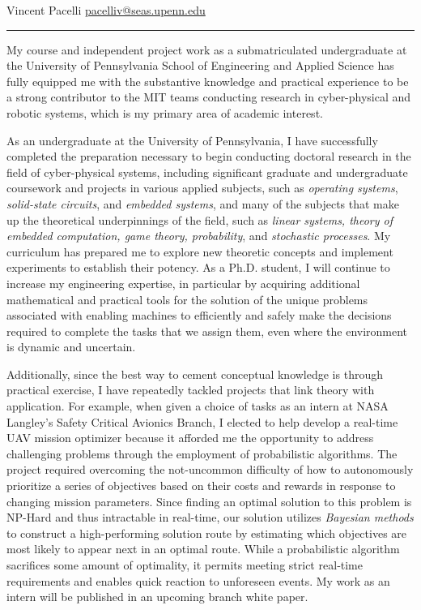 \documentclass[11pt]{letter}
\title{}
\author{}
\begin{document}
\newcommand{\comm}[1]{}

Vincent Pacelli \hfill \hfill \href{mailto:pacelliv@seas.upenn.edu}{pacelliv@seas.upenn.edu}\\
\rule{\textwidth}{0.1pt}

My course and independent project work as a submatriculated undergraduate at the University of Pennsylvania School of Engineering and Applied Science has fully equipped me with the substantive knowledge and practical experience to be a strong contributor to the MIT teams conducting research in cyber-physical and robotic systems, which is my primary area of academic interest.

As an undergraduate at the University of Pennsylvania, I have successfully completed the preparation necessary to begin conducting doctoral research in the field of cyber-physical systems, including significant graduate and undergraduate coursework and projects in various applied subjects, such as \emph{operating systems}, \emph{solid-state circuits}, and \emph{embedded systems}, and many of the subjects that make up the theoretical underpinnings of the field, such as \emph{linear systems, theory of embedded computation, game theory, probability}, and \emph{stochastic processes}.  My curriculum has prepared me to explore new theoretic concepts and implement experiments to establish their potency.  As a Ph.D. student, I will continue to increase my engineering expertise, in particular by acquiring additional mathematical and practical tools for the solution of the unique problems associated with enabling machines to efficiently and safely make the decisions required to complete the tasks that we assign them, even where the environment is dynamic and uncertain.

Additionally, since the best way to cement conceptual knowledge is through practical exercise, I have repeatedly tackled projects that link theory with application. For example, when given a choice of tasks as an intern at NASA Langley’s Safety Critical Avionics Branch, I elected to help develop a real-time UAV mission optimizer because it afforded me the opportunity to address challenging problems through the employment of probabilistic algorithms.  The project required overcoming the not-uncommon difficulty of how to autonomously prioritize a series of objectives based on their costs and rewards in response to changing mission parameters. Since finding an optimal solution to this problem is NP-Hard and thus intractable in real-time, our solution utilizes \emph{Bayesian methods} to construct a high-performing solution route by estimating which objectives are most likely to appear next in an optimal route.  While a probabilistic algorithm sacrifices some amount of optimality, it permits meeting strict real‑time requirements and enables quick reaction to unforeseen events.  My work as an intern will be published in an upcoming branch white paper.
\end{document}
